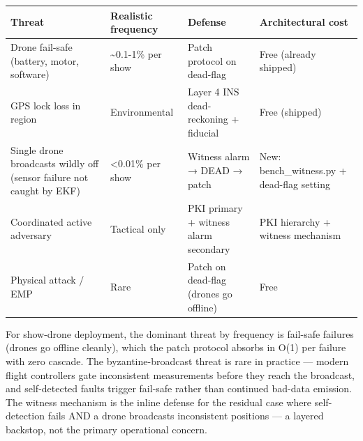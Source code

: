{\def\LTcaptype{none} %
\begin{longtable}[]{@{}
  >{\raggedright\arraybackslash}p{}
  >{\raggedright\arraybackslash}p{}
  >{\raggedright\arraybackslash}p{}
  >{\raggedright\arraybackslash}p{}@{}}
\toprule\noalign{}
\begin{minipage}[b]{\linewidth}\raggedright
Threat
\end{minipage} & \begin{minipage}[b]{\linewidth}\raggedright
Realistic frequency
\end{minipage} & \begin{minipage}[b]{\linewidth}\raggedright
Defense
\end{minipage} & \begin{minipage}[b]{\linewidth}\raggedright
Architectural cost
\end{minipage} \\
\midrule\noalign{}
\endhead
\bottomrule\noalign{}
\endlastfoot
Drone fail-safe (battery, motor, software) & \textasciitilde0.1-1\% per
show & Patch protocol on dead-flag & Free (already shipped) \\
GPS lock loss in region & Environmental & Layer 4 INS dead-reckoning +
fiducial & Free (shipped) \\
Single drone broadcasts wildly off (sensor failure not caught by EKF) &
\textless0.01\% per show & Witness alarm → DEAD → patch & New:
bench\_witness.py + dead-flag setting \\
Coordinated active adversary & Tactical only & PKI primary + witness
alarm secondary & PKI hierarchy + witness mechanism \\
Physical attack / EMP & Rare & Patch on dead-flag (drones go offline) &
Free \\
\end{longtable}
}

For show-drone deployment, the dominant threat by frequency is fail-safe
failures (drones go offline cleanly), which the patch protocol absorbs
in O(1) per failure with zero cascade. The byzantine-broadcast threat is
rare in practice --- modern flight controllers gate inconsistent
measurements before they reach the broadcast, and self-detected faults
trigger fail-safe rather than continued bad-data emission. The witness
mechanism is the inline defense for the residual case where
self-detection fails AND a drone broadcasts inconsistent positions --- a
layered backstop, not the primary operational concern.

